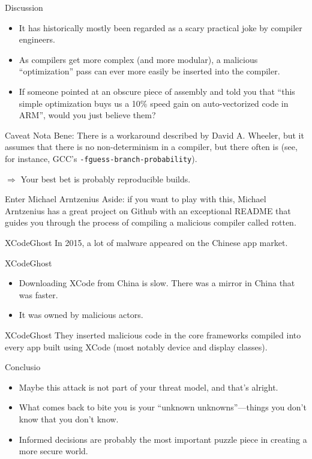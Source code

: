 \documentclass[aspectratio=169]{beamer}
\begin{document}
  \begin{frame}{Discussion}
    \begin{itemize}
      \item It has historically mostly been regarded as a scary practical joke
            by compiler engineers.
      \item As compilers get more complex (and more modular), a malicious
            “optimization” pass can ever more easily be inserted into the
            compiler.
      \item If someone pointed at an obscure piece of assembly and told you
            that “this simple optimization buys us a 10\% speed gain on
            auto-vectorized code in ARM”, would you just believe them?
    \end{itemize}
  \end{frame}
  \begin{frame}{Caveat}
    Nota Bene: There is a workaround described by David A. Wheeler, but it
    assumes that there is no non-determinism in a compiler, but there often is
    (see, for instance, GCC’s \texttt{-fguess-branch-probability}).

    $\Rightarrow$ Your best bet is probably reproducible builds.
  \end{frame}
  \begin{frame}{Enter Michael Arntzenius}
    Aside: if you want to play with this, Michael Arntzenius has a great project
    on Github with an exceptional README that guides you through the process of
    compiling a malicious compiler called rotten.
  \end{frame}
  \begin{frame}{XCodeGhost}
    In 2015, a lot of malware appeared on the Chinese app market.
  \end{frame}
  \begin{frame}{XCodeGhost}
    \begin{itemize}
      \item Downloading XCode from China is slow. There was a mirror in China
            that was faster.
      \item It was owned by malicious actors.
    \end{itemize}
  \end{frame}
  \begin{frame}{XCodeGhost}
    They inserted malicious code in the core frameworks compiled into every app
    built using XCode (most notably device and display classes).
  \end{frame}
  \begin{frame}{Conclusio}
    \begin{itemize}
      \item Maybe this attack is not part of your threat model, and that’s
            alright.
      \item What comes back to bite you is your “unknown unknowns”—things you
            don’t know that you don’t know.
      \item Informed decisions are probably the most important puzzle piece in
            creating a more secure world.
    \end{itemize}
  \end{frame}
\end{document}
